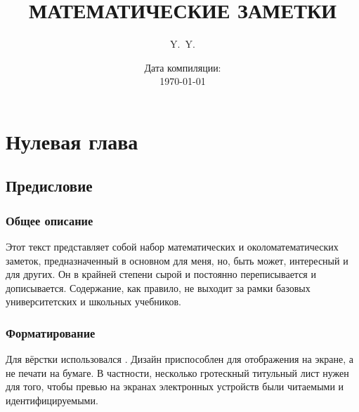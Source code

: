 \documentclass[
	extrafontsizes,
	11pt,
	hyphens,
]{memoir}
\begin{document}
\begin{titlingpage*}



\title{\MakeUppercase{Математические} \MakeUppercase{Заметки}}

\author{Y.\ Y.}

\date{Дата компиляции:\\ \raggedleft\today}

\maketitle

\end{titlingpage*}



\frontmatter*

\pagestyle{tocpagestyle}

\tableofcontents



\chapter{Нулевая глава}


\pagestyle{intro}


\section{Предисловие}

\subsection{Общее описание}

Этот текст представляет собой набор математических и околоматематических заметок, предназначенный в основном для меня, но, быть может, интересный и для других.
Он в крайней степени сырой и постоянно переписывается и дописывается.
Содержание, как правило, не выходит за рамки базовых университетских и школьных учебников.

\subsection{Форматирование}

Для вёрстки использовался \XeLaTeX.
Дизайн приспособлен для отображения на экране, а не печати на бумаге.
В частности, несколько гротескный титульный лист нужен для того, чтобы превью на экранах электронных устройств были читаемыми и идентифицируемыми.
\end{document}
